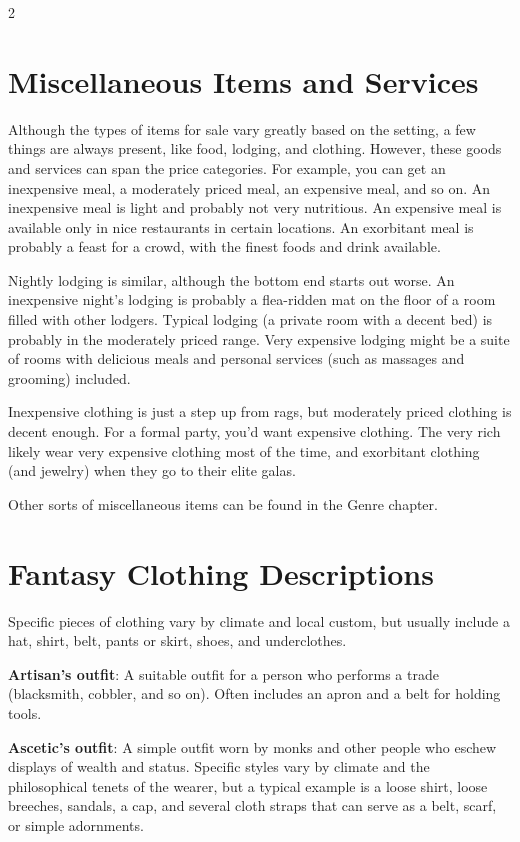 \begin{multicols}{2}

\section{Miscellaneous Items and Services}

Although the types of items for sale vary greatly based on the setting, a few things are always present, like food, lodging, and clothing. However, these goods and services can span the price categories. For example, you can get an inexpensive meal, a moderately priced meal, an expensive meal, and so on. An inexpensive meal is light and probably not very nutritious. An expensive meal is available only in nice restaurants in certain locations. An exorbitant meal is probably a feast for a crowd, with the finest foods and drink available.

Nightly lodging is similar, although the bottom end starts out worse. An inexpensive night’s lodging is probably a flea-ridden mat on the floor of a room filled with other lodgers. Typical lodging (a private room with a decent bed) is probably in the moderately priced range. Very expensive lodging might be a suite of rooms with delicious meals and personal services (such as massages and grooming) included.

Inexpensive clothing is just a step up from rags, but moderately priced clothing is decent enough. For a formal party, you’d want expensive clothing. The very rich likely wear very expensive clothing most of the time, and exorbitant clothing (and jewelry) when they go to their elite galas.

Other sorts of miscellaneous items can be found in the Genre chapter.

\section{Fantasy Clothing Descriptions}

Specific pieces of clothing vary by climate and local custom, but usually include a hat, shirt, belt, pants or skirt, shoes, and underclothes. 

\textbf{Artisan’s outfit}: A suitable outfit for a person who performs a trade (blacksmith, cobbler, and so on). Often includes an apron and a belt for holding tools. 

\textbf{Ascetic’s outfit}: A simple outfit worn by monks and other people who eschew displays of wealth and status. Specific styles vary by climate and the philosophical tenets of the wearer, but a typical example is a loose shirt, loose breeches, sandals, a cap, and several cloth straps that can serve as a belt, scarf, or simple adornments. 


\end{multicols}
